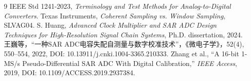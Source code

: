 \documentclass[UTF8,fontset=windows,a4paper,10.5pt]{ctexart}
\begin{document}
\begin{thebibliography}{9}\small
{} IEEE Std 1241-2023, \emph{Terminology and Test Methods for Analog-to-Digital Converters}.
 Texas Instruments, \emph{Coherent Sampling vs. Window Sampling}, SLVAG04.
 S. Huang, \emph{Advanced Clock Multiplier and SAR ADC Design Techniques for High-Resolution Signal Chain Systems}, Ph.D. dissertation, 2024.
 王巍等，“一种SAR ADC电容失配自测量与数字校准技术”，《微电子学》，52(4), 550--554, 2022, DOI: 10.13911/j.cnki.1004-3365.210333.
 Zhang et al., “A 16-bit 1-MS/s Pseudo-Differential SAR ADC With Digital Calibration,” \emph{IEEE Access}, 2019, DOI: 10.1109/ACCESS.2019.2937384.
\end{thebibliography}
\end{document}

